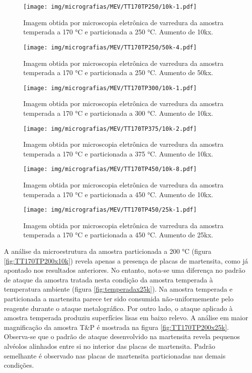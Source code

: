 \begin{figure}
	\texttt{[image: img/micrografias/MEV/TT170TP250/10k-1.pdf]}
	\caption{Imagem obtida por microscopia eletrônica de varredura da amostra temperada a 170 °C e particionada a 250 °C. Aumento de 10kx.}
	\label{fig:TT170TP250x10k}
\end{figure}

\begin{figure}
	\texttt{[image: img/micrografias/MEV/TT170TP250/50k-4.pdf]}
	\caption{Imagem obtida por microscopia eletrônica de varredura da amostra temperada a 170 °C e particionada a 250 °C. Aumento de 50kx.}
	\label{fig:TT170TP250x50k}
\end{figure}

\begin{figure}
	\texttt{[image: img/micrografias/MEV/TT170TP300/10k-1.pdf]}
	\caption{Imagem obtida por microscopia eletrônica de varredura da amostra temperada a 170 °C e particionada a 300 °C. Aumento de 10kx.}
	\label{fig:TT170TP300x10k}
\end{figure}

\begin{figure}
	\texttt{[image: img/micrografias/MEV/TT170TP375/10k-2.pdf]}
	\caption{Imagem obtida por microscopia eletrônica de varredura da amostra temperada a 170 °C e particionada a 375 °C. Aumento de 10kx.}
	\label{fig:TT170TP375x10k}
\end{figure}

\begin{figure}
	\texttt{[image: img/micrografias/MEV/TT170TP450/10k-8.pdf]}
	\caption{Imagem obtida por microscopia eletrônica de varredura da amostra temperada a 170 °C e particionada a 450 °C. Aumento de 10kx.}
	\label{fig:TT170TP450x10k}
\end{figure}

\begin{figure}
	\texttt{[image: img/micrografias/MEV/TT170TP450/25k-1.pdf]}
	\caption{Imagem obtida por microscopia eletrônica de varredura da amostra temperada a 170 °C e particionada a 450 °C. Aumento de 25kx.}
	\label{fig:TT170TP450x25k}
\end{figure}

A análise da microestrutura da amostra particionada a 200 °C (figura \ref{fig:TT170TP200x10k}) revela apenas a presença de placas de martensita, como já apontado nos resultados anteriores. No entanto, nota-se uma diferença no padrão de ataque da amostra tratada nesta condição da amostra temperada à temperatura ambiente (figura \ref{fig:temperadax25k}). Na amostra temperada e particionada a martensita parece ter sido consumida não-uniformemente pelo reagente durante o ataque metalográfico. Por outro lado, o ataque aplicado à amostra temperada produziu superfícies lisas em baixo relevo. A análise em maior magnificação da amostra T\&P é mostrada na figura \ref{fig:TT170TP200x25k}. Observa-se que o padrão de ataque desenvolvido na martensita revela pequenos alvéolos alinhados entre si no interior das placas de martensita. Padrão semelhante é observado nas placas de martensita particionadas nas demais condições.

